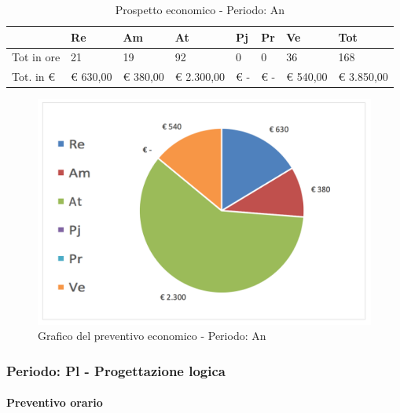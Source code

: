							\begin{table}[H] \begin{center} \begin{tabular}{llllllll}
							\toprule
								&	\textbf{Re}	&	\textbf{Am}	&	\textbf{At}	&	\textbf{Pj}	&	\textbf{Pr}	&	\textbf{Ve}	&	\textbf{Tot}\\
							\midrule
							Tot in ore	&	21	&	19	&	92	&	0	&	0	&	36	&	168	 \\
							Tot. in €	&	 €     630,00 	 & 	 €  380,00 	 & 	 €  2.300,00 	 & 	 €           -   	 & 	 €               -   	 & 	 €  540,00 	 & 	 €        3.850,00 	 \\
							\bottomrule
							\end{tabular} \end{center} \caption{Prospetto economico - Periodo:
							An
							}\label{tab:s_An} \end{table}		\begin{figure}[H]  \centering  \includegraphics[scale=0.40]{img/s_An}
									\caption{Grafico del preventivo economico - Periodo: An}  \label{fig:s_An"} 		\end{figure}


		\newpage
		\subsubsection {Periodo: Pl - Progettazione logica}
		\paragraph{Preventivo orario}


